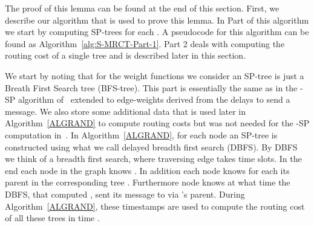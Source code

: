 \documentclass[11pt]{article}
\begin{document}
The proof of this lemma can be found at the end of this section. First, we describe our algorithm that is used to prove this lemma. In Part  of this algorithm we start by computing SP-trees  for each . A pseudocode for this algorithm can be found as Algorithm~\ref{alg:S-MRCT-Part-1}. Part 2 deals with computing the routing cost of a single tree and is described later in this section.

We start by noting that for the weight functions we consider an SP-tree is just a Breath First Search tree (BFS-tree). This part is essentially the same as in the -SP algorithm of~\cite{holzer2012optimal} extended to edge-weights derived from the delays to send a message. We also store some additional data that is used later in Algorithm~\ref{ALGRAND} to compute routing costs but was not needed for the -SP computation in~\cite{holzer2012optimal}. In Algorithm~\ref{ALGRAND}, for each node  an SP-tree  is constructed using what we call delayed breadth first search (DBFS). By DBFS we think of a breadth first search, where traversing edge  takes  time slots. In the end each node  in the graph knows . In addition each node  knows for each  its parent in the corresponding tree . Furthermore node  knows at what time the DBFS, that computed , sent its message to  via 's parent. During Algorithm~\ref{ALGRAND}, these timestamps are used to compute the routing cost of all these trees in time . 
\end{document}
